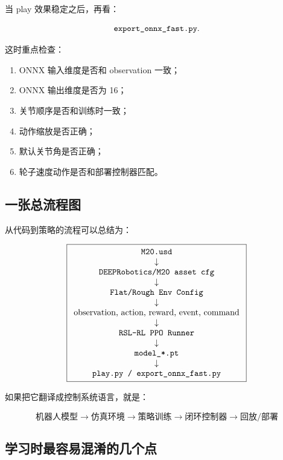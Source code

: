 \documentclass[UTF8,11pt,a4paper]{ctexart}
\begin{document}
当 play 效果稳定之后，再看：

\[
\text{\texttt{export\_onnx\_fast.py}}.
\]

这时重点检查：

\begin{enumerate}
  \item ONNX 输入维度是否和 observation 一致；
  \item ONNX 输出维度是否为 16；
  \item 关节顺序是否和训练时一致；
  \item 动作缩放是否正确；
  \item 默认关节角是否正确；
  \item 轮子速度动作是否和部署控制器匹配。
\end{enumerate}

\subsection{一张总流程图}

从代码到策略的流程可以总结为：

\[
\boxed{
\begin{array}{c}
\text{\texttt{M20.usd}}
\\
\downarrow
\\
\text{\texttt{DEEPRobotics/M20 asset cfg}}
\\
\downarrow
\\
\text{\texttt{Flat/Rough Env Config}}
\\
\downarrow
\\
\text{observation, action, reward, event, command}
\\
\downarrow
\\
\text{\texttt{RSL-RL PPO Runner}}
\\
\downarrow
\\
\text{\texttt{model\_*.pt}}
\\
\downarrow
\\
\text{\texttt{play.py / export\_onnx\_fast.py}}
\end{array}
}
\]

如果把它翻译成控制系统语言，就是：

\[
\boxed{
\text{机器人模型}
\rightarrow
\text{仿真环境}
\rightarrow
\text{策略训练}
\rightarrow
\text{闭环控制器}
\rightarrow
\text{回放/部署}
}
\]

\subsection{学习时最容易混淆的几个点}
\end{document}
